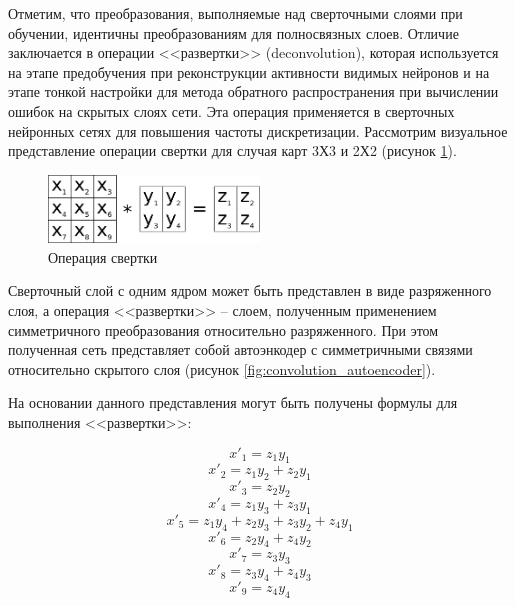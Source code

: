 Отметим, что преобразования, выполняемые над сверточными слоями при обучении, идентичны преобразованиям для полносвязных слоев. 
Отличие заключается в операции <<развертки>> (deconvolution), которая используется на этапе предобучения при реконструкции активности видимых нейронов и на этапе тонкой настройки для метода обратного распространения при вычислении ошибок на скрытых слоях сети. Эта операция применяется в сверточных нейронных сетях для повышения частоты дискретизации.
Рассмотрим визуальное представление операции свертки для случая карт 3Х3 и 2Х2 (рисунок \ref{fig:convolution}).

\begin{figure}[H]
  \centering
  \includegraphics[width=0.5\textwidth]{man-source/images/ch2/pic2-4.png}
  \caption{Операция свертки}
  \label{fig:convolution}
\end{figure}

Сверточный слой с одним ядром может быть представлен в виде разряженного слоя, а операция <<развертки>> -- слоем, полученным применением симметричного преобразования относительно разряженного. При этом полученная сеть представляет собой автоэнкодер с симметричными связями относительно скрытого слоя (рисунок \ref{fig:convolution_autoencoder}).

На основании данного представления могут быть получены формулы для выполнения <<развертки>>:

\begin{equation*}
	x'_1 = z_1y_1		
	\end{equation*}
	\begin{equation*}
	x'_2 = z_1y_2+z_2y_1
	\end{equation*}
	\begin{equation*}
	x'_3 = z_2y_2
	\end{equation*}
	\begin{equation*}
	x'_4 = z_1y_3 + z_3y_1
	\end{equation*}
	\begin{equation*}
	x'_5 = z_1y_4 + z_2y_3 + z_3y_2 + z_4y_1
	\end{equation*}
	\begin{equation*}
	x'_6 = z_2y_4 + z_4y_2
	\end{equation*}
	\begin{equation*}
	x'_7 = z_3y_3
	\end{equation*}
	\begin{equation*}
	x'_8 = z_3y_4 + z_4y_3
	\end{equation*}		
	\begin{equation*}
	x'_9 = z_4y_4
	\end{equation*}	

